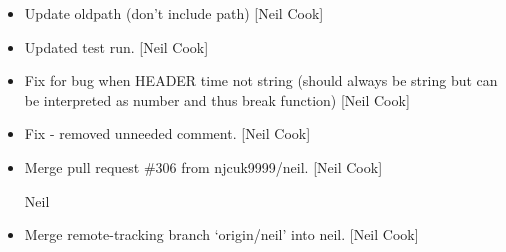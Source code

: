 \documentclass[a4paper,10pt,english]{report}
\begin{document}
\begin{itemize}
\item {} 
Update oldpath (don’t include path) {[}Neil Cook{]}

\item {} 
Updated test run. {[}Neil Cook{]}

\item {} 
Fix for bug when HEADER time not string (should always be string but
can be interpreted as number and thus break function) {[}Neil Cook{]}

\item {} 
Fix - removed unneeded comment. {[}Neil Cook{]}

\item {} 
Merge pull request \#306 from njcuk9999/neil. {[}Neil Cook{]}

Neil

\item {} 
Merge remote-tracking branch ‘origin/neil’ into neil. {[}Neil Cook{]}

\end{itemize}
\end{document}
